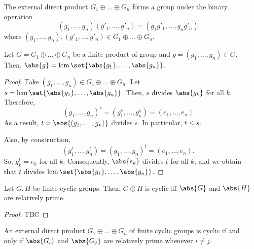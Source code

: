 \documentclass[11pt]{penrose}
\begin{document}
\begin{nthm}
    The external direct product $G_{1} \oplus \dots \oplus G_{n}$ forms a group under the binary operation
    \begin{equation*}
        (g_{1}, \dots, g_{n}) (g'_{1}, \dots, g'_{n}) = (g_{1}g'_{1}, \dots, g_{n}g'_{n})
    \end{equation*}
    where $(g_{1}, \dots, g_{n}), (g'_{1}, \dots, g'_{n}) \in G_{1} \oplus \dots \oplus G_{n}$.
\end{nthm}


\begin{nthm}
    Let $G = G_{1} \oplus \dots \oplus G_{n}$ be a finite product of group and $g = (g_{1}, \dots, g_{n}) \in G$. Then, $\abs{g} = \lcm \set{\abs{g_{1}}, \dots, \abs{g_{n}}}$.
\end{nthm}
\begin{proof}
    Take $(g_{1}, \dots, g_{n}) \in G_{1} \oplus \dots \oplus G_{n}$. Let $s = \lcm \set{\abs{g_{1}}, \dots, \abs{g_{n}}}$. Then, $s$ divides $\abs{g_{k}}$ for all $k$. Therefore,
    \begin{equation*}
        (g_{1}, \dots, g_{n})^{s}
        = (g_{1}^{s}, \dots, g_{n}^{s})
        = (e_{1}, \dots, e_{n})
    \end{equation*}
    As a result, $t = \abs{(g_{1}, \dots, g_{n})}$ divides $s$. In particular, $t \leq s$.

    Also, by construction,
    \begin{equation*}
        (g_{1}^{t}, \dots, g_{n}^{t})
        = (g_{1}, \dots, g_{n})^{t}
        = (e_{1}, \dots, e_{n}).
    \end{equation*}
    So, $g_{k}^{t} = e_{k}$ for all $k$. Consequently, $\abs{e_{k}}$ divides $t$ for all $k$, and we obtain that $t$ divides $\lcm \set{\abs{g_{1}}, \dots, \abs{g_{n}}}$.
\end{proof}

\begin{nthm}
    Let $G, H$ be finite cyclic groups. Then, $G \oplus H$ is cyclic iff $\abs{G}$ and $\abs{H}$ are relatively prime.
\end{nthm}
\begin{proof}
    TBC
\end{proof}

\begin{ncor}
    An external direct product $G_{1} \oplus \dots \oplus G_{n}$ of finite cyclic groups is cyclic if and only if $\abs{G_{i}}$ and $\abs{G_{j}}$ are relatively prime whenever $i \neq j$.
\end{ncor}
\end{document}
